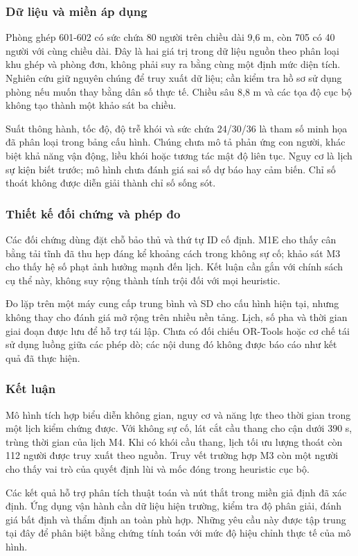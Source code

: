 \subsubsection{Dữ liệu và miền áp dụng}
Phòng ghép 601-602 có sức chứa 80 người trên chiều dài 9,6 m, còn 705 có 40 người với cùng chiều dài. Đây là hai giá trị trong dữ liệu nguồn theo phân loại khu ghép và phòng đơn, không phải suy ra bằng cùng một định mức diện tích. Nghiên cứu giữ nguyên chúng để truy xuất dữ liệu; cần kiểm tra hồ sơ sử dụng phòng nếu muốn thay bằng dân số thực tế. Chiều sâu 8,8 m và các tọa độ cục bộ không tạo thành một khảo sát ba chiều.

Suất thông hành, tốc độ, độ trễ khói và sức chứa 24/30/36 là tham số minh họa đã phân loại trong bảng cấu hình. Chúng chưa mô tả phản ứng con người, khác biệt khả năng vận động, liều khói hoặc tương tác mật độ liên tục. Nguy cơ là lịch sự kiện biết trước; mô hình chưa đánh giá sai số dự báo hay cảm biến. Chỉ số thoát không được diễn giải thành chỉ số sống sót.

\subsubsection{Thiết kế đối chứng và phép đo}
Các đối chứng dùng đặt chỗ bảo thủ và thứ tự ID cố định. M1E cho thấy cân bằng tải tĩnh đã thu hẹp đáng kể khoảng cách trong không sự cố; khảo sát M3 cho thấy hệ số phạt ảnh hưởng mạnh đến lịch. Kết luận cần gắn với chính sách cụ thể này, không suy rộng thành tính trội đối với mọi heuristic.

Đo lặp trên một máy cung cấp trung bình và SD cho cấu hình hiện tại, nhưng không thay cho đánh giá mở rộng trên nhiều nền tảng. Lịch, số pha và thời gian giai đoạn được lưu để hỗ trợ tái lập. Chưa có đối chiếu OR-Tools hoặc cơ chế tái sử dụng luồng giữa các phép dò; các nội dung đó không được báo cáo như kết quả đã thực hiện.

\subsubsection{Kết luận}
Mô hình tích hợp biểu diễn không gian, nguy cơ và năng lực theo thời gian trong một lịch kiểm chứng được. Với không sự cố, lát cắt cầu thang cho cận dưới 390 s, trùng thời gian của lịch M4. Khi có khói cầu thang, lịch tối ưu lượng thoát còn 112 người được truy xuất theo nguồn. Truy vết trường hợp M3 còn một người cho thấy vai trò của quyết định lùi và mốc đóng trong heuristic cục bộ.

Các kết quả hỗ trợ phân tích thuật toán và nút thắt trong miền giả định đã xác định. Ứng dụng vận hành cần dữ liệu hiện trường, kiểm tra độ phân giải, đánh giá bất định và thẩm định an toàn phù hợp. Những yêu cầu này được tập trung tại đây để phân biệt bằng chứng tính toán với mức độ hiệu chỉnh thực tế của mô hình.
